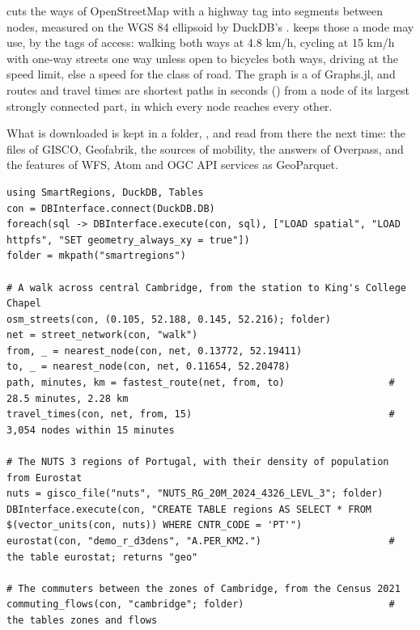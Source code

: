  cuts the ways of OpenStreetMap with a highway tag into segments between nodes, measured on the WGS 84
ellipsoid by DuckDB's .  keeps those a mode may use, by the tags of access:
walking both ways at 4.8 km/h, cycling at 15 km/h with one-way streets one way unless open to bicycles both ways, driving
at the speed limit, else a speed for the class of road. The graph is a  of Graphs.jl, and routes and
travel times are shortest paths in seconds () from a node of its largest strongly
connected part, in which every node reaches every other.

What is downloaded is kept in a folder, , and read from there the next time: the files of GISCO, Geofabrik,
the sources of mobility, the answers of Overpass, and the features of WFS, Atom and OGC API services as GeoParquet.

\begin{footnotesize}
\begin{verbatim}
using SmartRegions, DuckDB, Tables
con = DBInterface.connect(DuckDB.DB)
foreach(sql -> DBInterface.execute(con, sql), ["LOAD spatial", "LOAD httpfs", "SET geometry_always_xy = true"])
folder = mkpath("smartregions")

# A walk across central Cambridge, from the station to King's College Chapel
osm_streets(con, (0.105, 52.188, 0.145, 52.216); folder)
net = street_network(con, "walk")
from, _ = nearest_node(con, net, 0.13772, 52.19411)
to, _ = nearest_node(con, net, 0.11654, 52.20478)
path, minutes, km = fastest_route(net, from, to)                  # 28.5 minutes, 2.28 km
travel_times(con, net, from, 15)                                  # 3,054 nodes within 15 minutes

# The NUTS 3 regions of Portugal, with their density of population from Eurostat
nuts = gisco_file("nuts", "NUTS_RG_20M_2024_4326_LEVL_3"; folder)
DBInterface.execute(con, "CREATE TABLE regions AS SELECT * FROM $(vector_units(con, nuts)) WHERE CNTR_CODE = 'PT'")
eurostat(con, "demo_r_d3dens", "A.PER_KM2.")                      # the table eurostat; returns "geo"

# The commuters between the zones of Cambridge, from the Census 2021
commuting_flows(con, "cambridge"; folder)                         # the tables zones and flows
\end{verbatim}
\end{footnotesize}

